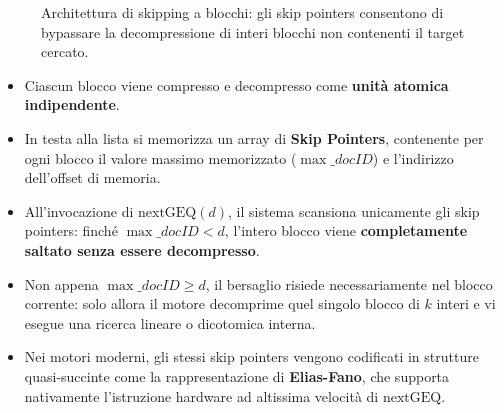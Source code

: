 \begin{figure}[H]
{%
}
\caption{Architettura di skipping a blocchi: gli skip pointers consentono di bypassare la decompressione di interi blocchi non contenenti il target cercato.}
\label{fig:block-skipping-schema}
\end{figure}

\begin{itemize}
    \item Ciascun blocco viene compresso e decompresso come \textbf{unit\`a atomica indipendente}.
    \item In testa alla lista si memorizza un array di \textbf{Skip Pointers}, contenente per ogni blocco il valore massimo memorizzato ($\max\_docID$) e l'indirizzo dell'offset di memoria.
    \item All'invocazione di $\text{nextGEQ}(d)$, il sistema scansiona unicamente gli skip pointers: finch\'e $\max\_docID < d$, l'intero blocco viene \textbf{completamente saltato senza essere decompresso}.
    \item Non appena $\max\_docID \ge d$, il bersaglio risiede necessariamente nel blocco corrente: solo allora il motore decomprime quel singolo blocco di $k$ interi e vi esegue una ricerca lineare o dicotomica interna.
    \item Nei motori moderni, gli stessi skip pointers vengono codificati in strutture quasi-succinte come la rappresentazione di \textbf{Elias-Fano}, che supporta nativamente l'istruzione hardware ad altissima velocit\`a di $\text{nextGEQ}$.
\end{itemize}

